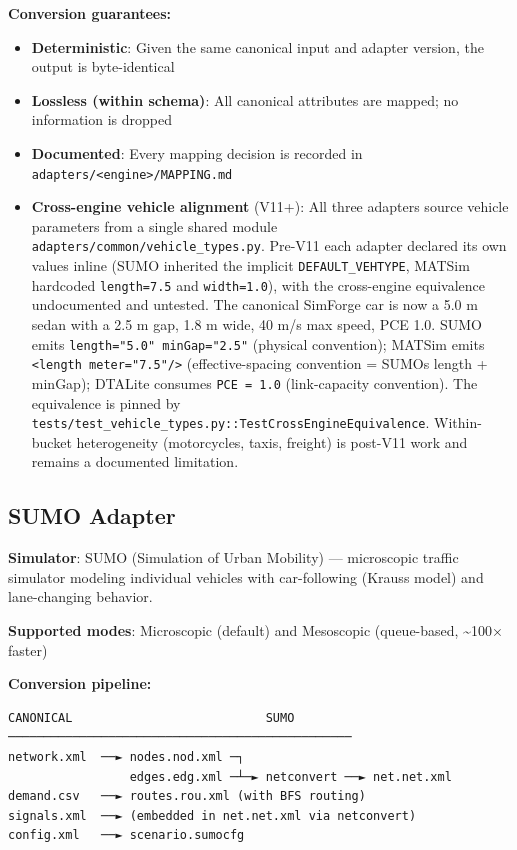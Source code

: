 \textbf{Conversion guarantees:}

\begin{itemize}
\tightlist
\item
  \textbf{Deterministic}: Given the same canonical input and adapter
  version, the output is byte-identical
\item
  \textbf{Lossless (within schema)}: All canonical attributes are
  mapped; no information is dropped
\item
  \textbf{Documented}: Every mapping decision is recorded in
  \texttt{adapters/\textless{}engine\textgreater{}/MAPPING.md}
\item
  \textbf{Cross-engine vehicle alignment} (V11+): All three adapters
  source vehicle parameters from a single shared module
  \texttt{adapters/common/vehicle\_types.py}. Pre-V11 each adapter
  declared its own values inline (SUMO inherited the implicit
  \texttt{DEFAULT\_VEHTYPE}, MATSim hardcoded \texttt{length=7.5} and
  \texttt{width=1.0}), with the cross-engine equivalence undocumented
  and untested. The canonical SimForge car is now a 5.0 m sedan with a
  2.5 m gap, 1.8 m wide, 40 m/s max speed, PCE 1.0. SUMO emits
  \texttt{length="5.0"\ minGap="2.5"} (physical convention); MATSim
  emits \texttt{\textless{}length\ meter="7.5"/\textgreater{}}
  (effective-spacing convention = SUMO\textquotesingle s length +
  minGap); DTALite consumes \texttt{PCE\ =\ 1.0} (link-capacity
  convention). The equivalence is pinned by
  \texttt{tests/test\_vehicle\_types.py::TestCrossEngineEquivalence}.
  Within-bucket heterogeneity (motorcycles, taxis, freight) is post-V11
  work and remains a documented limitation.
\end{itemize}

\subsection{SUMO Adapter}\label{342-sumo-adapter}

\textbf{Simulator}: SUMO (Simulation of Urban Mobility) --- microscopic
traffic simulator modeling individual vehicles with car-following
(Krauss model) and lane-changing behavior.

\textbf{Supported modes}: Microscopic (default) and Mesoscopic
(queue-based, \textasciitilde100× faster)

\textbf{Conversion pipeline:}

\begin{verbatim}
CANONICAL                           SUMO
────────────────────────────────────────────────
network.xml  ──► nodes.nod.xml ─┐
                 edges.edg.xml ─┴─► netconvert ──► net.net.xml
demand.csv   ──► routes.rou.xml (with BFS routing)
signals.xml  ──► (embedded in net.net.xml via netconvert)
config.xml   ──► scenario.sumocfg
\end{verbatim}

